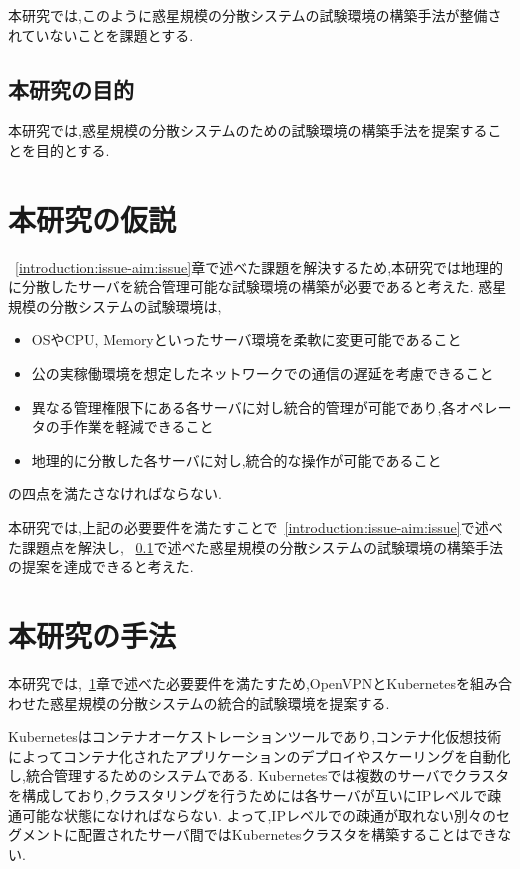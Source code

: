 本研究では,このように惑星規模の分散システムの試験環境の構築手法が整備されていないことを課題とする.

\subsection{本研究の目的}
\label{introduction:issue-aim:aim}

本研究では,惑星規模の分散システムのための試験環境の構築手法を提案することを目的とする.

\section{本研究の仮説}
\label{introduction:hypothesis}

~\ref{introduction:issue-aim:issue}章で述べた課題を解決するため,本研究では地理的に分散したサーバを統合管理可能な試験環境の構築が必要であると考えた.
惑星規模の分散システムの試験環境は,
\begin{itemize}
  \item OSやCPU, Memoryといったサーバ環境を柔軟に変更可能であること
  \item 公の実稼働環境を想定したネットワークでの通信の遅延を考慮できること
  \item 異なる管理権限下にある各サーバに対し統合的管理が可能であり,各オペレータの手作業を軽減できること
  \item 地理的に分散した各サーバに対し,統合的な操作が可能であること
\end{itemize}
の四点を満たさなければならない.

本研究では,上記の必要要件を満たすことで~\ref{introduction:issue-aim:issue}で述べた課題点を解決し,
~\ref{introduction:issue-aim:aim}で述べた惑星規模の分散システムの試験環境の構築手法の提案を達成できると考えた.

\section{本研究の手法}
\label{introduction:proposal}

本研究では,~\ref{introduction:hypothesis}章で述べた必要要件を満たすため,OpenVPNとKubernetesを組み合わせた惑星規模の分散システムの統合的試験環境を提案する.

Kubernetesはコンテナオーケストレーションツールであり,コンテナ化仮想技術によってコンテナ化されたアプリケーションのデプロイやスケーリングを自動化し,統合管理するためのシステムである.
Kubernetesでは複数のサーバでクラスタを構成しており,クラスタリングを行うためには各サーバが互いにIPレベルで疎通可能な状態になければならない.
よって,IPレベルでの疎通が取れない別々のセグメントに配置されたサーバ間ではKubernetesクラスタを構築することはできない.

